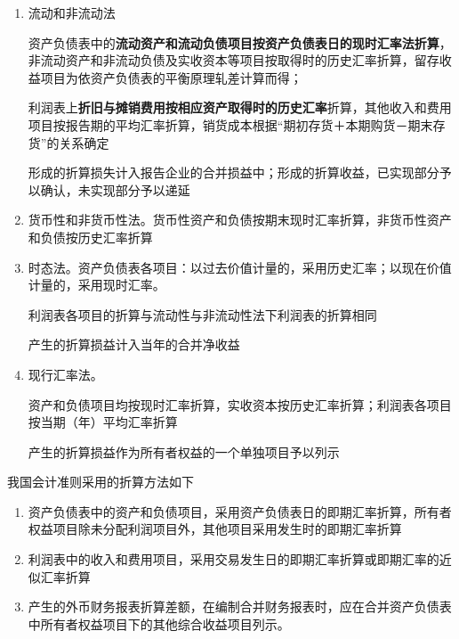\documentclass[UTF8,12pt]{ctexart}
\numberwithin{equation}{section} %
\numberwithin{figure}{section}
\numberwithin{table}{section}
\begin{document}
	\begin{enumerate}
		\item 流动和非流动法
		
		资产负债表中的\textbf{流动资产和流动负债项目按资产负债表日的现时汇率法折算}，非流动资产和非流动负债及实收资本等项目按取得时的历史汇率折算，留存收益项目为依资产负债表的平衡原理轧差计算而得；
		
		利润表上\textbf{折旧与摊销费用按相应资产取得时的历史汇率}折算，其他收入和费用项目按报告期的平均汇率折算，销货成本根据“期初存货＋本期购货－期末存货”的关系确定
		
		形成的折算损失计入报告企业的合并损益中；形成的折算收益，已实现部分予以确认，未实现部分予以递延
		
		\item 货币性和非货币性法。货币性资产和负债按期末现时汇率折算，非货币性资产和负债按历史汇率折算
		
		\item 时态法。资产负债表各项目：以过去价值计量的，采用历史汇率；以现在价值计量的，采用现时汇率。
		
		利润表各项目的折算与流动性与非流动性法下利润表的折算相同
		
		产生的折算损益计入当年的合并净收益
		
		
		\item 现行汇率法。
		
		资产和负债项目均按现时汇率折算，实收资本按历史汇率折算；利润表各项目按当期（年）平均汇率折算
		
		产生的折算损益作为所有者权益的一个单独项目予以列示
	\end{enumerate}
	
	我国会计准则采用的折算方法如下
	\begin{enumerate}
		\item 资产负债表中的资产和负债项目，采用资产负债表日的即期汇率折算，所有者权益项目除未分配利润项目外，其他项目采用发生时的即期汇率折算
		
		\item 利润表中的收入和费用项目，采用交易发生日的即期汇率折算或即期汇率的近似汇率折算
		
		\item 产生的外币财务报表折算差额，在编制合并财务报表时，应在合并资产负债表中所有者权益项目下的其他综合收益项目列示。
		
	\end{enumerate}
	
\end{document}
